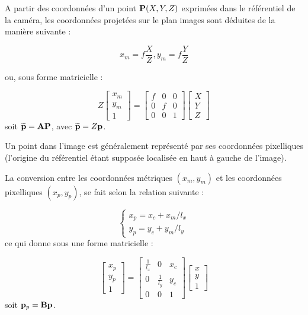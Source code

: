 A partir des coordonnées d'un point ${\bf P}(X, Y, Z)$ exprimées dans le 
référentiel de la caméra, les coordonnées projetées sur le plan images sont 
déduites de la manière suivante :

\begin{equation}
x_m = f \frac{X}{Z}, y_m = f \frac{Y}{Z}
\label{intro:eq12}
\end{equation}

ou, sous forme matricielle :

\begin{equation}
Z
\begin{bmatrix}
x_m \\y_m \\ 1
\end{bmatrix}
=
\begin{bmatrix}
f & 0 & 0 \\ 0 & f & 0 \\ 0 & 0 & 1 
\end{bmatrix}
\begin{bmatrix}
X \\ Y \\ Z 
\end{bmatrix}
\label{intro:eq13}
\end{equation}
soit $\widetilde {\bf p} = {\bf A}{\bf P}$, avec $\widetilde {\bf p} = Z {\bf 
p}$.

Un point dans l'image est généralement représenté par ses coordonnées 
pi\-xelliques (l'origine du référentiel étant supposée localisée en haut à 
gauche de l'image).

La conversion entre les coordonnées métriques $(x_m, y_m)$ et les coordonnées 
pixelliques $(x_p, y_p)$, se fait selon la relation suivante :

\begin{equation}
\left \lbrace
\begin{matrix}
x_p = x_c + x_m/l_x \\
y_p = y_c + y_m/l_y
\end{matrix} \right .
\label{intro:eq14}
\end{equation}
ce qui donne sous une forme matricielle :

\begin{equation}
\begin{bmatrix}
x_p \\y_p \\ 1
\end{bmatrix}
=
\begin{bmatrix}
\frac 1 {l_x} & 0 & x_c \\ 0 & \frac 1 {l_y} & y_c \\ 0 & 0 & 1 
\end{bmatrix}
\begin{bmatrix}
x \\ y \\ 1
\end{bmatrix}
\label{intro:eq15}
\end{equation}
soit ${\bf p}_p = {\bf B} {\bf p}$.


